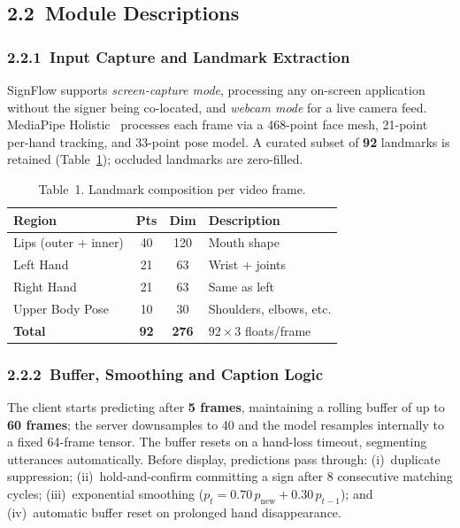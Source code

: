 \documentclass[10pt, twocolumn]{article}
\begin{document}
\subsection*{2.2~Module Descriptions}

\subsubsection*{2.2.1~Input Capture and Landmark Extraction}
SignFlow supports \emph{screen-capture mode}, processing any on-screen application without the signer being co-located, and \emph{webcam mode} for a live camera feed. MediaPipe Holistic~\cite{mediapipe} processes each frame via a 468-point face mesh, 21-point per-hand tracking, and 33-point pose model. A curated subset of \textbf{92} landmarks is retained (Table~\ref{tab:landmarks}); occluded landmarks are zero-filled.

\begin{table}[h]
\centering
\caption{Table~1. Landmark composition per video frame.}
\label{tab:landmarks}
\setlength{\tabcolsep}{3pt}
\small
\begin{tabular}{|l|c|c|p{2.2cm}|}
\hline
\textbf{Region} & \textbf{Pts} & \textbf{Dim} & \textbf{Description} \\
\hline
Lips (outer + inner) & 40 & 120 & Mouth shape \\
\hline
Left Hand  & 21 & 63 & Wrist + joints \\
\hline
Right Hand & 21 & 63 & Same as left \\
\hline
Upper Body Pose & 10 & 30 & Shoulders, elbows, etc. \\
\hline
\textbf{Total} & \textbf{92} & \textbf{276} & $92\times3$ floats/frame \\
\hline
\end{tabular}
\end{table}

\subsubsection*{2.2.2~Buffer, Smoothing and Caption Logic}
The client starts predicting after \textbf{5 frames}, maintaining a rolling buffer of up to \textbf{60 frames}; the server downsamples to 40 and the model resamples internally to a fixed 64-frame tensor. The buffer resets on a hand-loss timeout, segmenting utterances automatically. Before display, predictions pass through: (i)~duplicate suppression; (ii)~hold-and-confirm committing a sign after 8 consecutive matching cycles; (iii)~exponential smoothing ($p_t = 0.70\,p_\text{new}+0.30\,p_{t-1}$); and (iv)~automatic buffer reset on prolonged hand disappearance.
\end{document}
